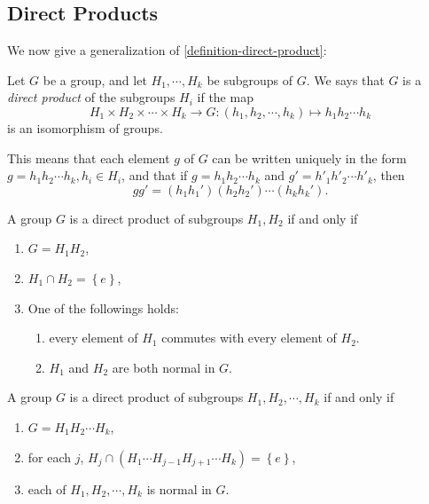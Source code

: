 \subsection{Direct Products}
\label{subsection-direct-products}

We now give a generalization of \ref{definition-direct-product}:
\begin{definition}
  \label{definition-generalization-direct-product}
  Let \( G \) be a group, and let \( H_1, \cdots, H_k \) be subgroups of \( G \).
  We says that \( G \) is a \emph{direct product} of the subgroups \( H_i \) if the map
  \[
    H_1 \times H_2 \times \cdots \times H_k \to G: (h_1, h_2, \cdots, h_k) \mapsto h_1h_2\cdots h_k
  \]
  is an isomorphism of groups.
\end{definition}
\begin{remark}
  \label{remark-element-in-direct-product}
  This means that each element \( g \) of \( G \) can be written uniquely in the form \( g = h_1h_2 \cdots h_k, h_i \in H_i \), and that if \( g = h_1 h_2 \cdots h_k \) and \( g' = h'_1 h'_2 \cdots h'_k \), then
  \[
    g g' = (h_1 h_1')(h_2 h_2') \cdots (h_k h_k').
  \]
\end{remark}

\begin{proposition}
  \label{proposition-iff-conditions-of-direct-product}
  A group \( G \) is a direct product of subgroups \( H_1, H_2 \) if and only if
  \begin{enumerate}
    \item \( G = H_1 H_2 \),
    \item \( H_1 \cap H_2 = \left\lbrace e \right\rbrace \),
    \item One of the followings holds:
      \begin{enumerate}
        \item every element of \( H_1 \) commutes with every element of \( H_2 \).
        \item \( H_1 \) and \( H_2 \) are both normal in \( G \). 
      \end{enumerate}
  \end{enumerate}
\end{proposition}

\begin{proposition}
  \label{proposition-iff-conditions-of-generalized-direct-product}
  A group \( G \) is a direct product of subgroups \( H_1, H_2, \cdots, H_k \) if and only if
  \begin{enumerate}
    \item \( G = H_1 H_2 \cdots H_k \),
    \item for each \( j \), \( H_j \cap (H_1 \cdots H_{j - 1} H_{j + 1} \cdots H_k) = \left\lbrace e \right\rbrace \),
    \item each of \( H_1, H_2, \cdots, H_k \) is normal in \( G \).
  \end{enumerate}
\end{proposition}

